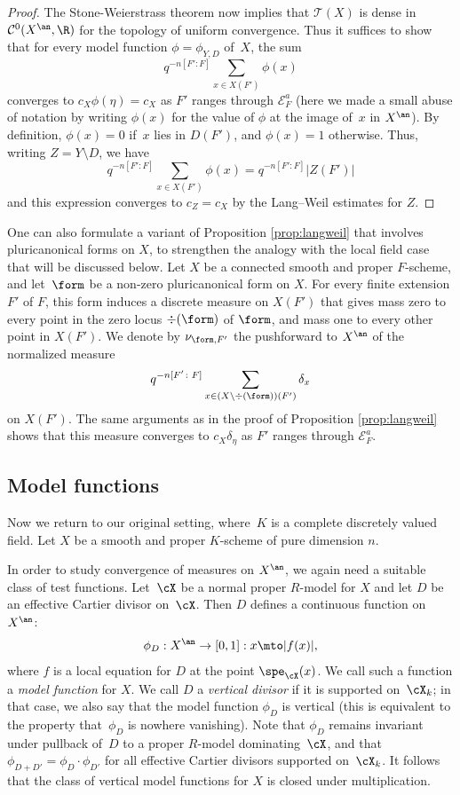 \begin{proof}
The Stone-Weierstrass theorem now implies that $\mathcal{T}(X)$ is dense in
$\mathcal{C}^0(X^{\an},\R)$ for the topology of uniform convergence. Thus it suffices to show that for every model function $\phi=\phi_{Y,D}$ of~$X$, the sum
\[
q^{-n[F'\colon F]}\sum_{x\in X(F')}\phi(x)
\]
converges to $c_X\phi(\eta)=c_X$
as $F'$ ranges through $\mathcal{E}^a_F$ (here we made a small abuse of notation by writing $\phi(x)$ for the value of $\phi$ at the image of~$x$ in $X^{\an}$).
By definition, $\phi(x)=0$ if~$x$ lies in $D(F')$, and $\phi(x)=1$ otherwise.
Thus, writing $Z=Y\setminus D$, we have
\[
q^{-n[F'\colon F]}\sum_{x\in X(F')}\phi(x)=q^{-n[F'\colon F]}|Z(F')|
\]
and this expression converges to $c_Z=c_X$ by the Lang--Weil estimates for $Z$.
\end{proof}

\begin{remark}
One can also formulate a variant of Proposition \ref{prop:langweil} that involves pluricanonical forms on $X$, to strengthen the analogy with the local field case that will be discussed below. Let $X$ be a connected smooth and proper $F$-scheme, and let~$\form$ be a non-zero pluricanonical form on $X$. For every finite extension $F'$ of $F$, this form induces a discrete measure on $X(F')$ that gives mass zero to every point in the zero locus $\div(\form)$ of $\form$, and mass one to every other point in $X(F')$.
We denote by $\nu_{\form,F'}$
the pushforward to $X^{\an}$ of the normalized measure
\[
q^{-n[F'\colon F]}\sum_{x\in (X\setminus \div(\form))(F')}\delta_x
\]
on $X(F')$.
The same arguments as in the proof of Proposition \ref{prop:langweil} shows that this measure converges to $c_X\delta_{\eta}$ as $F'$ ranges through $\mathcal{E}_F^a$.
\end{remark}

\subsection{Model functions}
Now we return to our original setting, where~$K$ is a complete discretely valued field.
Let $X$ be a smooth and proper $K$\nobreakdash-scheme of pure dimension $n$.

In order to study convergence of measures on $X^{\an}$, we again need a suitable class of test functions.
Let~$\cX$ be a normal proper $R$\nobreakdash-model for $X$ and let $D$ be an effective Cartier divisor on~$\cX$. Then $D$ defines a continuous function on $X^{\an}$:
\[
\phi_D:X^{\an}\to [0,1]:x\mto |f(x)|,
\]
where $f$ is a local equation for $D$ at the point $\spe_{\cX}(x)$. We call such a function a {\em model function} for $X$.
We call $D$ a {\em vertical divisor} if it is supported on~$\cX_k$;
in that case, we also say that the model function $\phi_D$ is vertical (this is equivalent to the property that~$\phi_D$ is nowhere vanishing).
Note that $\phi_D$ remains invariant under pullback of~$D$ to a proper $R$\nobreakdash-model dominating~$\cX$, and that $\phi_{D+D'}=\phi_D\cdot \phi_{D'}$ for all
effective Cartier divisors supported on~$\cX_k$. It follows that the class of vertical model functions for $X$ is closed under multiplication.

